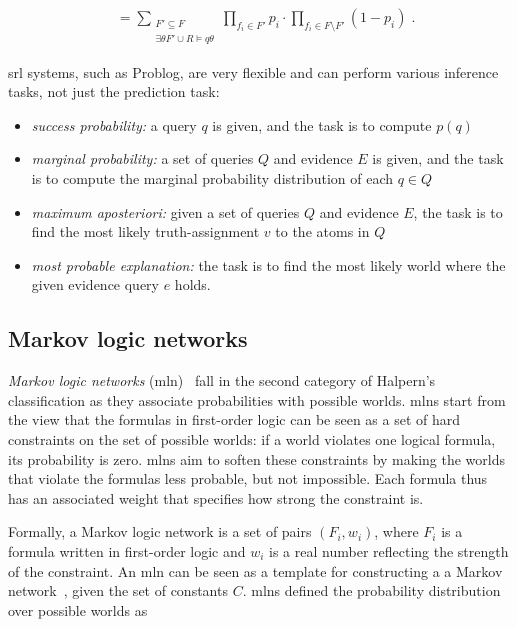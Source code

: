 $$
\begin{aligned}
&= \sum \limits _{\begin{array}{c} F'\subseteq F \\ \exists \theta F'\cup R\models q\theta \end{array}} \prod _{f_i\in F'}p_i\cdot \prod _{f_i\in F\setminus F'}(1-p_i)\;.
\end{aligned}
$$


\gls{srl} systems, such as Problog, are very flexible and can perform various inference tasks, not just the prediction task:
\begin{itemize}
	\item \textit{success probability:} a query $q$ is given, and the task is to compute $p(q)$
	\item \textit{marginal probability:} a set of queries $Q$ and evidence $E$ is given, and the task is to compute the marginal probability distribution of each $q \in Q$
	\item \textit{maximum aposteriori:} given a set of queries $Q$ and evidence $E$, the task is to find the most likely truth-assignment $v$ to the atoms in $Q$
	\item \textit{most probable explanation:} the task is to find the most likely world where the given evidence query $e$ holds.
\end{itemize}





\subsection{Markov logic networks}

\textit{Markov logic networks} (\gls{mln})~\cite{Richardson2006} fall in the second category of Halpern's classification as they associate probabilities with possible worlds.
\gls{mln}s start from the view that the formulas in first-order logic can be seen as a set of hard constraints on the set of possible worlds: if a world violates one logical formula, its probability is zero.
\gls{mln}s aim to soften these constraints by making the worlds that violate the formulas less probable, but not impossible.
Each formula thus has an associated weight that specifies how strong the constraint is.


Formally, a Markov logic network is a set of pairs $(F_i,w_i)$, where $F_i$ is a formula written in first-order logic and $w_i$ is a real number reflecting the strength of the constraint.
An \gls{mln} can be seen as a template for constructing a a Markov network~\cite{koller2009probabilistic}, given the set of constants $C$.
\gls{mln}s defined the probability distribution over possible worlds as

